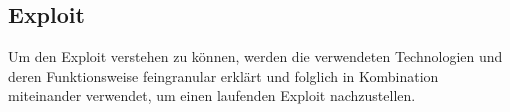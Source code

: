 
\subsection{Exploit}\label{subsec:exploit}
Um den Exploit verstehen zu können, werden die verwendeten Technologien und deren Funktionsweise
feingranular erklärt und folglich in Kombination miteinander verwendet, um einen laufenden Exploit nachzustellen.
